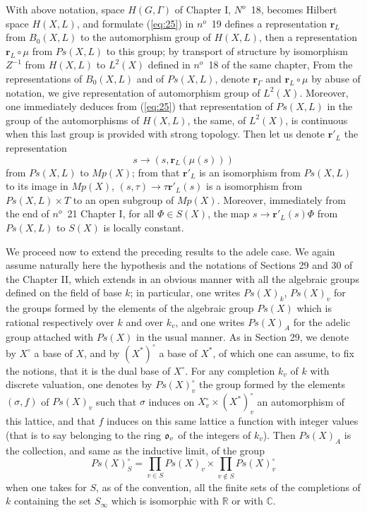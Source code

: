 \documentclass[12pt]{amsart}
\def\br{{\mathbf{r}}}
\newcounter{ssection}
\renewcommand{\subsection}{
  \addtocounter{ssection}{1}{\bf  \arabic{ssection}.\  }}
\begin{document}
With above notation, space $H(G,\Gamma)$ of Chapter I, $N^o$~18, 
becomes Hilbert space $H(X,L)$, and formulate (\ref{eq:25})
in $n^o$~19  defines a representation $\br_L$ from $B_0(X,L)$ to 
the automorphism group of $H(X,L)$, then a representation 
$\br_L\circ \mu$ from $Ps(X, L)$ to this group;
by transport of structure by isomorphism 
$Z^{-1}$ from $H(X,L)$ to $L^2(X)$ defined in $n^o$~18 of the same chapter,
From the representations of $B_0(X, L)$ and of $Ps (X, L)$, denote $\br_\Gamma$
and $\br_L\circ \mu$ by abuse of notation, we give representation of 
automorphism group of $L^2(X)$.
Moreover, one immediately deduces from (\ref{eq:25}) that 
representation of $Ps(X, L)$ in the group of the automorphisms of $H(X, L)$, 
the same, of $L^2(X)$, 
is continuous when this last group is provided with strong topology. 
Then let us denote $\br'_L$ the representation
\[
s\to (s,\br_L(\mu(s)))
\]
from $Ps(X,L)$ to $Mp(X)$;
from that $\br'_L$ is an isomorphism from $Ps(X, L)$ 
to its image in $Mp(X)$, $(s,\tau)\to \tau \br'_L(s)$ is a isomorphism from 
$Ps(X,L)\times T$ to an open subgroup of $Mp(X)$. 
Moreover, immediately from the end of  $n^o$~21  
Chapter I, for all $\Phi\in S(X)$, the map $s\to \br'_L(s)\Phi$ from $Ps(X,L)$
to $S(X)$ is locally constant.  

\subsection{}
We proceed now to extend the preceding results to the adele case.
We again assume naturally here the hypothesis and the notations of
Sections 29 and 30 of the Chapter II, which extends in an obvious
manner with all the algebraic groups defined on the field of base
$k$; in particular, one writes $Ps(X)_{k}$, $Ps(X)_{v}$ for the
groups formed by the elements of the algebraic group $Ps(X)$ which
is rational respectively over $k$ and over $k_{v}$, and one writes
$Ps(X)_{A}$ for the adelic group attached with $Ps(X)$ in the usual
manner. As in Section 29, we denote by $X^\circ$ a base of $X$, and
by $(X^*)^\circ$ a base of $X^*$, of which one can assume, to fix the
notions, that it is the dual base of $X^\circ$. For any completion
$k_{v}$ of $k$ with discrete valuation, one denotes by $Ps(X)_{v}^\circ$
the group formed by the elements $(\sigma,f)$ of $Ps(X)_{v}$ such
that $\sigma$ induces on $X_{v}^\circ\times(X^*)_{v}^\circ$ an automorphism
of this lattice, and that $f$ induces on this same lattice a function
with integer values (that is to say belonging to the ring $\mathfrak{o}_{v}$
of the integers of $k_{v}$). Then $Ps(X)_{A}$ is the collection,
and same as the inductive limit, of the group
\[
Ps(X)_{S}^\circ=\prod_{v\in S}Ps(X)_{v}\times\prod_{v\notin S}Ps(X)_{v}^\circ
\]
when one takes for $S$, as of the convention, all the finite sets
of the completions of $k$ containing the set $S_{\infty}$ which
is isomorphic with $\mathbb{R}$ or with $\mathbb{C}$.
\end{document}
